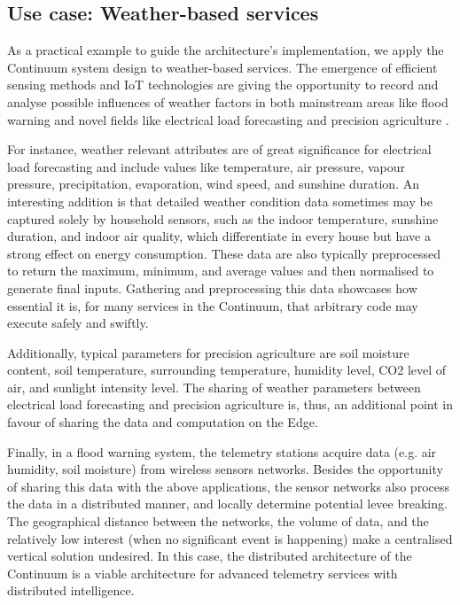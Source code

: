 \subsection{Use case: Weather-based services}\label{sec:uc}

As a practical example to guide the architecture's implementation, we apply the Continuum system design to weather-based services. The emergence of efficient sensing methods and IoT technologies are giving the opportunity to record and analyse possible influences of weather factors in both mainstream areas like flood warning \cite{brzoza2016embedded} and novel fields like electrical load forecasting \cite{weather-load-forecasting} and precision agriculture \cite{keswani2019adapting}.

For instance, weather relevant attributes are of great significance for electrical load forecasting and include values like temperature, air pressure, vapour pressure, precipitation, evaporation, wind speed, and sunshine duration. An interesting addition is that detailed weather condition data sometimes may be captured solely by household sensors, such as the indoor temperature, sunshine duration, and indoor air quality, which differentiate in every house but have a strong effect on energy consumption. These data are also typically preprocessed to return the maximum, minimum, and average values and then normalised to generate final inputs. Gathering and preprocessing this data showcases how essential it is, for many services in the Continuum, that arbitrary code may execute safely and swiftly.

Additionally, typical parameters for precision agriculture are soil moisture content, soil temperature, surrounding temperature, humidity level, CO2 level of air, and sunlight intensity level. The sharing of weather parameters between electrical load forecasting and precision agriculture is, thus, an additional point in favour of sharing the data and computation on the Edge.

Finally, in a flood warning system, the telemetry stations acquire data (e.g. air humidity, soil moisture) from wireless sensors networks. Besides the opportunity of sharing this data with the above applications, the sensor networks also process the data in a distributed manner, and locally determine potential levee breaking. The geographical distance between the networks, the volume of data, and the relatively low interest (when no significant event is happening) make a centralised vertical solution undesired. In this case, the distributed architecture of the Continuum is a viable architecture for advanced telemetry services with distributed intelligence.

